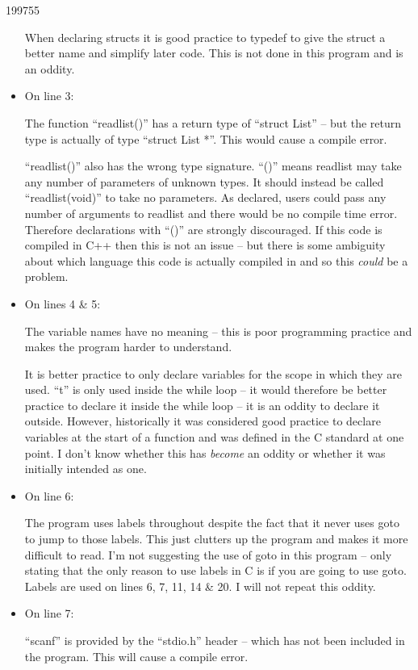 \documentclass[10pt,\jkfside,a4paper]{article}
\begin{document}
\begin{examquestion}{1997}{5}{5}
\begin{itemize}
When declaring structs it is good practice to typedef to give the struct a
better name and simplify later code. This is not done in this program and is
an oddity.

\item On line 3:

The function ``readlist()'' has a return type of ``struct List'' -- but
the return type is actually of type ``struct List *''. This would cause a
compile error.

``readlist()'' also has the wrong type signature. ``()'' means readlist may
take any number of parameters of unknown types. It should instead be called
``readlist(void)'' to take no parameters. As declared, users could pass any
number of arguments to readlist and there would be no compile time error.
Therefore declarations with ``()'' are strongly discouraged. If this code is
compiled in C++ then this is not an issue -- but there is some ambiguity about
which language this code is actually compiled in and so this \textit{could}
be a problem.

\item On lines 4 \& 5:

The variable names have no meaning -- this is poor programming practice and
makes the program harder to understand.

It is better practice to only declare variables for the scope in which they
are used. ``t'' is only used inside the while loop -- it would therefore be
better practice to declare it inside the while loop -- it is an oddity to
declare it outside. However, historically it was considered good practice to
declare variables at the start of a function and was defined in the C
standard at one point. I don't know whether this has \textit{become} an
oddity or whether it was initially intended as one.

\item On line 6:

The program uses labels throughout despite the fact that it never uses
goto to jump to those labels. This just clutters up the program and makes it
more difficult to read. I'm not suggesting the use of goto in this program --
only stating that the only reason to use labels in C is if you are going to
use goto. Labels are used on lines 6, 7, 11, 14 \& 20. I will not repeat
this oddity.

\item On line 7:

``scanf'' is provided by the ``stdio.h'' header -- which has not been
included in the program. This will cause a compile error.


\end{itemize}
\end{examquestion}
\end{document}
